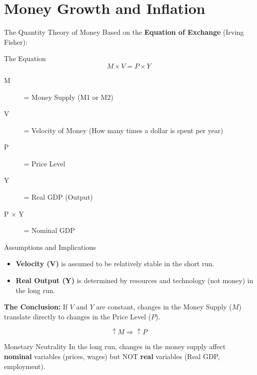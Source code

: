 \documentclass[aspectratio=169]{beamer}
\begin{document}
\section{Money Growth and Inflation}

\begin{frame}{The Quantity Theory of Money}
    Based on the \textbf{Equation of Exchange} (Irving Fisher):
    
    \begin{block}{The Equation}
        \[ M \times V = P \times Y \]
    \end{block}
    
    \begin{description}
        \item[M] = Money Supply (M1 or M2)
        \item[V] = Velocity of Money (How many times a dollar is spent per year)
        \item[P] = Price Level
        \item[Y] = Real GDP (Output)
        \item[P $\times$ Y] = Nominal GDP
    \end{description}
\end{frame}

\begin{frame}{Assumptions and Implications}
    \begin{itemize}
        \item \textbf{Velocity (V)} is assumed to be relatively stable in the short run.
        \item \textbf{Real Output (Y)} is determined by resources and technology (not money) in the long run.
    \end{itemize}
    
    \vspace{0.5cm}
    
    \textbf{The Conclusion:}
    If $V$ and $Y$ are constant, changes in the Money Supply ($M$) translate directly to changes in the Price Level ($P$).
    
    \[ \uparrow M \Rightarrow \uparrow P \]
    
    \begin{alertblock}{Monetary Neutrality}
        In the long run, changes in the money supply affect \textbf{nominal} variables (prices, wages) but NOT \textbf{real} variables (Real GDP, employment).
    \end{alertblock}
\end{frame}
\end{document}

